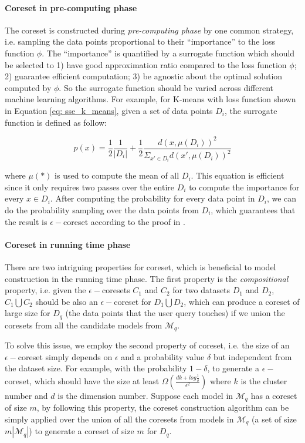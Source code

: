 \paragraph{Coreset in pre-computing phase} The coreset is constructed during {\em pre-computing phase} by one common strategy, i.e. sampling the data points proportional to their ``importance'' to the loss function $\phi$. The ``importance'' is quantified by a surrogate function which should be selected to 1) have good approximation ratio compared to the loss function $\phi$; 2) guarantee efficient computation; 3) be  agnostic about the optimal solution computed by $\phi$. So the surrogate function should be varied across different machine learning algorithms. For example, for K-means with loss function shown in Equation \ref{eq: sse_k_means}, given a set of data points $D_i$, the surrogate function is defined as follow:

\begin{equation}\label{eq: surrogate_function}
    p(x) = \frac{1}{2}\frac{1}{|D_i|} + \frac{1}{2}\frac{d(x, \mu(D_i))^2}{\Sigma_{x'\in D_i}d(x', \mu(D_i))^2}
\end{equation}

where $\mu(*)$ is used to compute the mean of all $D_i$. This equation is efficient since it only requires two passes over the entire $D_i$ to compute the importance for every $x \in D_i$. After computing the probability for every data point in $D_i$, we can do the probability sampling over the data points from $D_i$, which guarantees that the result is $\epsilon-$coreset according to the proof in \cite{bachem2017scalable}.

\paragraph{Coreset in running time phase} There are two intriguing properties for coreset, which is beneficial to model construction in the running time phase. The first property is the {\em compositional} property, i.e. given the $\epsilon-$coresets $C_1$ and $C_2$ for two datasets $D_1$ and $D_2$, $C_1 \bigcup C_2$ should be also an $\epsilon-$coreset for $D_1 \bigcup D_2$, which can produce a coreset of large size for $D_q$ (the data points that the user query touches) if we union the coresets from all the candidate models from $\mathcal{M}_q$. 

To solve this issue, we employ the second property of coreset, i.e. the size of an $\epsilon-$coreset simply depends on $\epsilon$ and a probability value $\delta$ but independent from the dataset size. For example, with the probability $1-\delta$, to generate a $\epsilon-$coreset, which should have the size at least $\Omega(\frac{dk+log\frac{1}{\delta}}{\epsilon^2})$ where $k$ is the cluster number and $d$ is the dimension number. Suppose each model in $\mathcal{M}_q$ has a coreset of size $m$, by following this property, the coreset construction algorithm can be simply applied over the union of all the coresets from models in $\mathcal{M}_q$ (a set of size $m|\mathcal{M}_q|$) to generate a coreset of size $m$ for $D_q$.